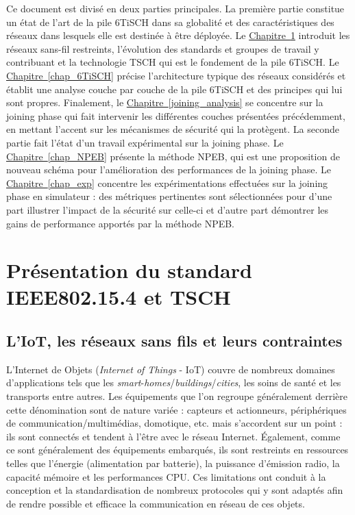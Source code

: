 \documentclass[]{report}
\newcommand{\wordlink}[2]{\hyperref[#2]{#1~\ref{#2}}}
\begin{document}
Ce document est divisé en deux parties principales. La première partie constitue un état de l'art de la pile 6TiSCH dans sa globalité et des caractéristiques des réseaux dans lesquels elle est destinée à être déployée. Le \wordlink{Chapitre}{chap_intro} introduit les réseaux sans-fil restreints, l'évolution des standards et groupes de travail y contribuant et la technologie TSCH qui est le fondement de la pile 6TiSCH. Le \wordlink{Chapitre}{chap_6TiSCH} précise l'architecture typique des réseaux considérés et établit une analyse couche par couche de la pile 6TiSCH et des principes qui lui sont propres. Finalement, le \wordlink{Chapitre}{joining_analysis} se concentre sur la joining phase qui fait intervenir les différentes couches présentées précédemment, en mettant l'accent sur les mécanismes de sécurité qui la protègent. La seconde partie fait l'état d'un travail expérimental sur la joining phase. Le \wordlink{Chapitre}{chap_NPEB} présente la méthode NPEB, qui est une proposition de nouveau schéma pour l'amélioration des performances de la joining phase. Le \wordlink{Chapitre}{chap_exp} concentre les expérimentations effectuées sur la joining phase en simulateur : des métriques pertinentes sont sélectionnées pour d'une part illustrer l'impact de la sécurité sur celle-ci et d'autre part démontrer les gains de performance apportés par la méthode NPEB.

\normalsize

\chapter{Présentation du standard IEEE802.15.4 et TSCH}
\label{chap_intro}
\newpage

\section{L'IoT, les réseaux sans fils et leurs contraintes}
\label{WSNs}

L'Internet de Objets (\textit{Internet of Things }- IoT) couvre de nombreux domaines d'applications tels que les \textit{smart}-\textit{homes}/\textit{buildings}/\textit{cities}, les soins de santé et les transports entre autres. Les équipements que l'on regroupe généralement derrière cette dénomination sont de nature variée : capteurs et actionneurs, périphériques de communication/multimédias, domotique, etc. mais s'accordent sur un point : ils sont connectés et tendent à l'être avec le réseau Internet. Également, comme ce sont généralement des équipements embarqués, ils sont restreints en ressources telles que l'énergie (alimentation par batterie), la puissance d'émission radio, la capacité mémoire et les performances CPU. Ces limitations ont conduit à la conception et la standardisation de nombreux protocoles qui y sont adaptés afin de rendre possible et efficace la communication en réseau de ces objets.\\
\end{document}
